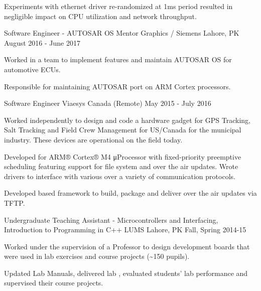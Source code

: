 \begin{cventries}
{\begin{cvitems}
        \item {Experiments with ethernet driver re-randomized at 1ms period resulted in negligible  impact on CPU utilization and network throughput. }
      \end{cvitems}
    }
  \cventry
    {Software Engineer - AUTOSAR OS} %
    {Mentor Graphics / Siemens} %
    {Lahore, PK} %
    {August 2016 - June 2017} %
    {
      \begin{cvitems} %
        \item {Worked in a team to implement features and maintain AUTOSAR OS for automotive ECUs. }
        \item {Responsible for maintaining AUTOSAR  port on ARM Cortex processors.}
      \end{cvitems}
    }

  \cventry
    {Software Engineer} %
    {Viaesys} %
    {Canada (Remote)} %
    {May 2015 - July 2016} %
    {
      \begin{cvitems} %
        \item {Worked independently to design and code a hardware gadget for GPS Tracking, Salt Tracking and Field Crew Management for US/Canada for the municipal industry. These devices are operational on the field today. }
        \item {Developed  for ARM® Cortex® M4 μProcessor with fixed-priority preemptive scheduling featuring support for file system and over the air updates. Wrote drivers to interface with various  over a variety of communication protocols.}
        \item {Developed  based framework to build, package and deliver over the air updates via TFTP.}
      \end{cvitems}
    }

  \cventry
    {Undergraduate Teaching Assistant - Microcontrollers and Interfacing, Introduction to Programming in C++} %
    {LUMS} %
    {Lahore, PK} %
    {Fall, Spring 2014-15} %
    {
      \begin{cvitems} %
        \item {Worked under the supervision of a Professor to design development boards that were used in lab exercises and course projects (\textasciitilde 150 pupils).}
        \item {Updated Lab Manuals, delivered lab , evaluated students’ lab performance and supervised their course projects.}
      \end{cvitems}
    }

\end{cventries}
